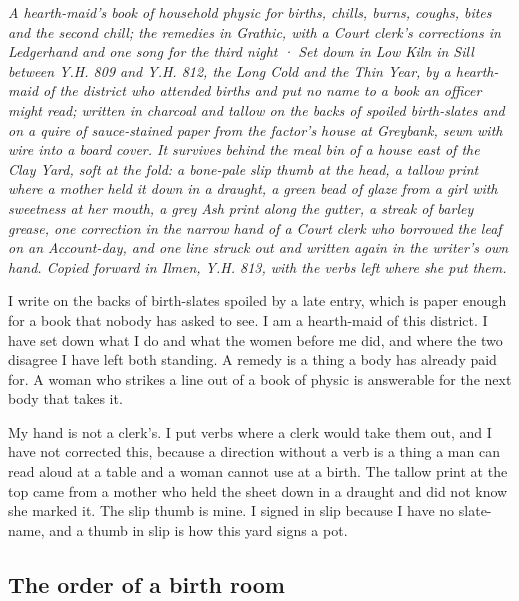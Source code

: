 \documentclass{design/chronicle}
\begin{document}
\clearpage{}
{\centering\FellFont\itshape\footnotesize\color{faded} A hearth-maid’s book of household physic for births, chills, burns, coughs, bites and the second chill; the remedies in Grathic, with a Court clerk’s corrections in Ledgerhand and one song for the third night · Set down in Low Kiln in Sill between Y.H. 809 and Y.H. 812, the Long Cold and the Thin Year, by a hearth-maid of the district who attended births and put no name to a book an officer might read; written in charcoal and tallow on the backs of spoiled birth-slates and on a quire of sauce-stained paper from the factor’s house at Greybank, sewn with wire into a board cover. It survives behind the meal bin of a house east of the Clay Yard, soft at the fold: a bone-pale slip thumb at the head, a tallow print where a mother held it down in a draught, a green bead of glaze from a girl with sweetness at her mouth, a grey Ash print along the gutter, a streak of barley grease, one correction in the narrow hand of a Court clerk who borrowed the leaf on an Account-day, and one line struck out and written again in the writer’s own hand. Copied forward in Ilmen, Y.H. 813, with the verbs left where she put them.\par}\medskip
I write on the backs of birth-slates spoiled by a late entry, which is paper enough for a book that nobody has asked to see. I am a hearth-maid of this district. I have set down what I do and what the women before me did, and where the two disagree I have left both standing. A remedy is a thing a body has already paid for. A woman who strikes a line out of a book of physic is answerable for the next body that takes it.

My hand is not a clerk’s. I put verbs where a clerk would take them out, and I have not corrected this, because a direction without a verb is a thing a man can read aloud at a table and a woman cannot use at a birth. The tallow print at the top came from a mother who held the sheet down in a draught and did not know she marked it. The slip thumb is mine. I signed in slip because I have no slate-name, and a thumb in slip is how this yard signs a pot.

\subsection*{The order of a birth room}
\end{document}
